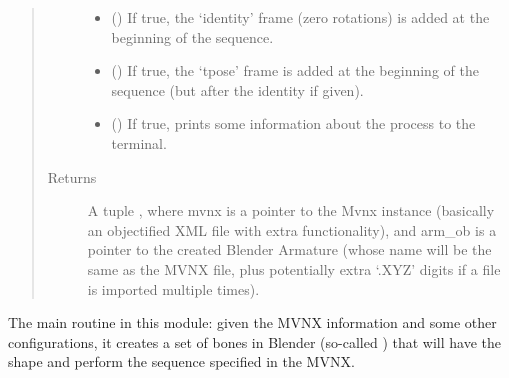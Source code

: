 \documentclass[letterpaper,10pt,english,openany,oneside]{sphinxmanual}
\begin{document}
\begin{fulllineitems}
\begin{quote}
\begin{description}
\begin{itemize}
\item {} 
 () \textendash{} If true, the ‘identity’ frame (zero
rotations) is added at the beginning of the sequence.

\item {} 
 () \textendash{} If true, the ‘tpose’ frame is added at the
beginning of the sequence (but after the identity if given).

\item {} 
 () \textendash{} If true, prints some information about the process
to the terminal.

\end{itemize}

\item[{Returns}] \leavevmode
A tuple , where mvnx is a pointer to the
Mvnx instance (basically an objectified XML file with extra
functionality), and arm\_ob is a pointer to the created Blender Armature
(whose name will be the same as the MVNX file, plus potentially extra
‘.XYZ’ digits if a file is imported multiple times).

\end{description}\end{quote}

The main routine in this module: given the MVNX information and some other
configurations, it creates a set of bones in Blender (so-called )
that will have the shape and perform the sequence specified in the MVNX.

\end{fulllineitems}

\end{document}
